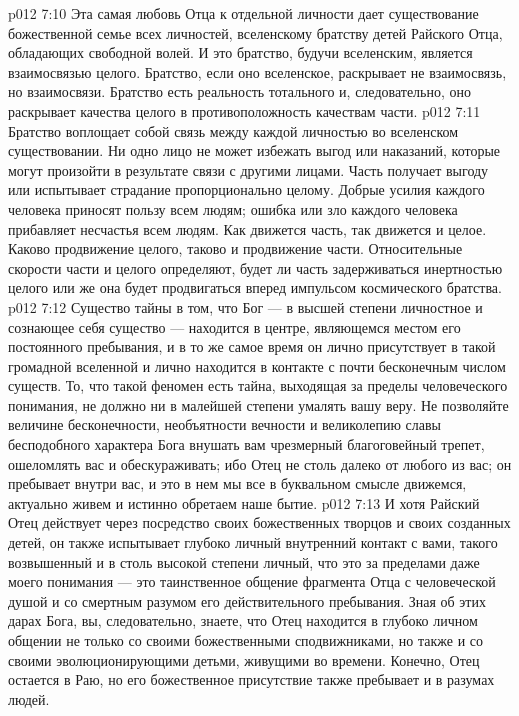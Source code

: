 \vs p012 7:10 Эта самая любовь Отца к отдельной личности дает существование божественной семье всех личностей, вселенскому братству детей Райского Отца, обладающих свободной волей. И это братство, будучи вселенским, является взаимосвязью целого. Братство, если оно вселенское, раскрывает не  взаимосвязь, но  взаимосвязи. Братство есть реальность тотального и, следовательно, оно раскрывает качества целого в противоположность качествам части.
\vs p012 7:11 Братство воплощает собой связь между каждой личностью во вселенском существовании. Ни одно лицо не может избежать выгод или наказаний, которые могут произойти в результате связи с другими лицами. Часть получает выгоду или испытывает страдание пропорционально целому. Добрые усилия каждого человека приносят пользу всем людям; ошибка или зло каждого человека прибавляет несчастья всем людям. Как движется часть, так движется и целое. Каково продвижение целого, таково и продвижение части. Относительные скорости части и целого определяют, будет ли часть задерживаться инертностью целого или же она будет продвигаться вперед импульсом космического братства.
\vs p012 7:12 \pc Существо тайны в том, что Бог --- в высшей степени личностное и сознающее себя существо --- находится в центре, являющемся местом его постоянного пребывания, и в то же самое время он лично присутствует в такой громадной вселенной и лично находится в контакте с почти бесконечным числом существ. То, что такой феномен есть тайна, выходящая за пределы человеческого понимания, не должно ни в малейшей степени умалять вашу веру. Не позволяйте величине бесконечности, необъятности вечности и великолепию славы бесподобного характера Бога внушать вам чрезмерный благоговейный трепет, ошеломлять вас и обескураживать; ибо Отец не столь далеко от любого из вас; он пребывает внутри вас, и это в нем мы все в буквальном смысле движемся, актуально живем и истинно обретаем наше бытие.
\vs p012 7:13 \pc И хотя Райский Отец действует через посредство своих божественных творцов и своих созданных детей, он также испытывает глубоко личный внутренний контакт с вами, такого возвышенный и в столь высокой степени личный, что это за пределами даже моего понимания --- это таинственное общение фрагмента Отца с человеческой душой и со смертным разумом его действительного пребывания. Зная об этих дарах Бога, вы, следовательно, знаете, что Отец находится в глубоко личном общении не только со своими божественными сподвижниками, но также и со своими эволюционирующими детьми, живущими во времени. Конечно, Отец остается в Раю, но его божественное присутствие также пребывает и в разумах людей.
